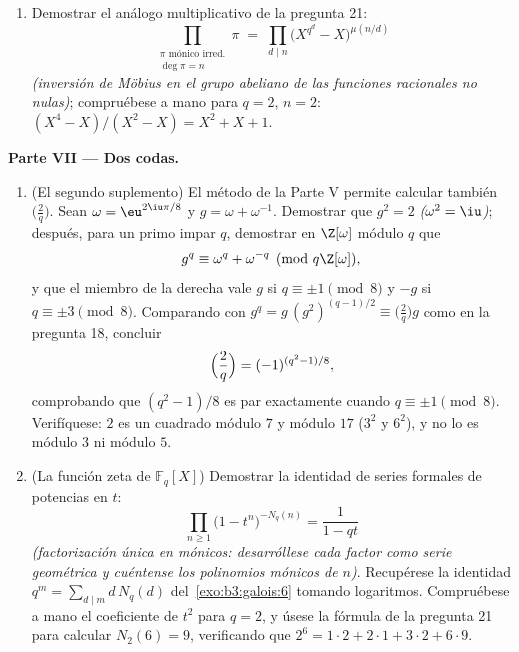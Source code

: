 \begin{problem}
\begin{enumerate}[resume]
   con probabilidad
  $\sim \frac1n$ --- el análogo
   del teorema de los números
  primos, con $\log x$ sustituido por $n$; compruébese numéricamente
  para $q = 2$, $n \leq 4$ (el~\cref{exo:b3:galois:6} da los recuentos).
  \item Demostrar el análogo multiplicativo de la pregunta 21:
        \[
        \prod_{\substack{\pi \text{ mónico irred.}\\ \deg\pi =
        n}}\pi \;=\; \prod_{d \mid n}
        \bigl(X^{q^d} - X\bigr)^{\mu(n/d)}
        \]
        \emph{(inversión de Möbius en el grupo abeliano de las funciones
        racionales no nulas)}; compruébese a mano para $q
        = 2$, $n = 2$: $(X^4 - X)/(X^2 - X) = X^2 + X + 1$.
\end{enumerate}

\medskip
\noindent\textbf{Parte VII --- Dos codas.}
\begin{enumerate}[resume]
  \item (El segundo suplemento) El método de la Parte V permite calcular
  también $\bigl(\frac2q\bigr)$. Sean $\omega = \eu^{2\iu\pi/8}$ y
  $g = \omega + \omega^{-1}$. Demostrar que $g^2 = 2$
  \emph{($\omega^2 = \iu$)}; después, para un primo impar $q$, demostrar
  en $\Z[\omega]$ módulo $q$ que
        \[
        g^q \equiv \omega^q + \omega^{-q} \pmod{q\Z[\omega]},
        \]
        y que el miembro de la derecha vale $g$ si $q \equiv \pm1
        \pmod 8$ y $-g$ si $q \equiv \pm3 \pmod 8$. Comparando con
        $g^q = g\,(g^2)^{(q-1)/2} \equiv
        \bigl(\frac2q\bigr)g$ como en la pregunta 18, concluir
        \[
        \Bigl(\frac2q\Bigr) = (-1)^{(q^2-1)/8},
        \]
        comprobando que $(q^2 - 1)/8$ es par exactamente cuando $q
        \equiv \pm1 \pmod 8$. Verifíquese: $2$ es un cuadrado módulo $7$
        y módulo $17$ ($3^2$ y $6^2$), y no lo es módulo $3$ ni módulo
        $5$.
  \item (La función zeta de $\mathbb F_q[X]$) Demostrar la identidad de
  series formales de potencias en $t$:
        \[
        \prod_{n \geq 1}\bigl(1 - t^n\bigr)^{-N_q(n)}
        = \frac1{1 - qt}
        \]
        \emph{(factorización única en
         mónicos:
        desarróllese cada factor como serie geométrica y cuéntense los
        polinomios mónicos de 
        $n$)}. Recupérese la identidad $q^m = \sum_{d \mid m}d\,N_q(d)$
        del~\cref{exo:b3:galois:6} tomando logaritmos. Compruébese a
        mano el coeficiente de $t^2$ para $q = 2$, y úsese la fórmula de
        la pregunta 21 para calcular $N_2(6) = 9$, verificando que
        $2^6 = 1\cdot2 + 2\cdot1 + 3\cdot2 +
        6\cdot9$.
\end{enumerate}
\end{problem}
